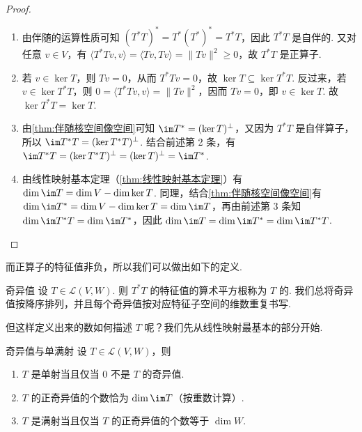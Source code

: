 \begin{proof}
    \begin{enumerate}
        \item 由伴随的运算性质可知 $(T^*T)^* = T^*(T^*)^* = T^*T$，因此 $T^*T$ 是自伴的. 又对任意 $v \in V$，有 $\langle T^*Tv, v \rangle = \langle Tv, Tv \rangle = \lVert Tv \rVert^2 \geqslant 0$，故 $T^*T$ 是正算子.

        \item 若 $v \in \ker T$，则 $Tv = 0$，从而 $T^*Tv = 0$，故 $\ker T \subseteq \ker T^*T$. 反过来，若 $v \in \ker T^*T$，则 $0 = \langle T^*Tv, v \rangle = \lVert Tv \rVert^2$，因而 $Tv = 0$，即 $v \in \ker T$. 故 $\ker T^*T = \ker T$.

        \item 由\autoref{thm:伴随核空间像空间}可知 $\im T^* = (\ker T)^{\perp}$，又因为 $T^*T$ 是自伴算子，所以 $\im T^*T = (\ker T^*T)^{\perp}$. 结合前述第 2 条，有 $\im T^*T = (\ker T^*T)^{\perp} = (\ker T)^{\perp} = \im T^*$.

        \item 由线性映射基本定理（\autoref{thm:线性映射基本定理}）有 $\dim \im T = \dim V - \dim \ker T$. 同理，结合\autoref{thm:伴随核空间像空间}有 $\dim \im T^* = \dim V - \dim \ker T = \dim \im T$，再由前述第 3 条知 $\dim \im T^*T = \dim \im T^*$，因此 $\dim \im T = \dim \im T^* = \dim \im T^*T$.
    \end{enumerate}
\end{proof}

而正算子的特征值非负，所以我们可以做出如下的定义.

\begin{definition}{奇异值}{} 
    设 $T \in \mathcal{L}(V, W)$. 则 $T^*T$ 的特征值的算术平方根称为 $T$ 的. 我们总将奇异值按降序排列，并且每个奇异值按对应特征子空间的维数重复书写.
\end{definition}

但这样定义出来的数如何描述 $T$ 呢？我们先从线性映射最基本的部分开始.

\begin{theorem}{}{奇异值与单满射}
    设 $T \in \mathcal{L}(V, W)$，则
    \begin{enumerate}
        \item $T$ 是单射当且仅当 $0$ 不是 $T$ 的奇异值.

        \item $T$ 的正奇异值的个数恰为 $\dim \im T$（按重数计算）.

        \item $T$ 是满射当且仅当 $T$ 的正奇异值的个数等于 $\dim W$.
    \end{enumerate}
\end{theorem}

